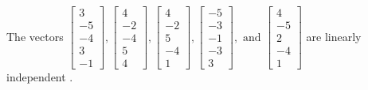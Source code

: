 \begin{exercise}
\begin{exerciseStatement}
  \end{exerciseStatement}
  \begin{exerciseAnswer}
   The vectors \(\left[\begin{array}{r}
3 \\
-5 \\
-4 \\
3 \\
-1
\end{array}\right] , \left[\begin{array}{r}
4 \\
-2 \\
-4 \\
5 \\
4
\end{array}\right] , \left[\begin{array}{r}
4 \\
-2 \\
5 \\
-4 \\
1
\end{array}\right] , \left[\begin{array}{r}
-5 \\
-3 \\
-1 \\
-3 \\
3
\end{array}\right] , \text{ and } \left[\begin{array}{r}
4 \\
-5 \\
2 \\
-4 \\
1
\end{array}\right]\) are 
  	 linearly independent  .
  


  \end{exerciseAnswer}
\end{exercise}